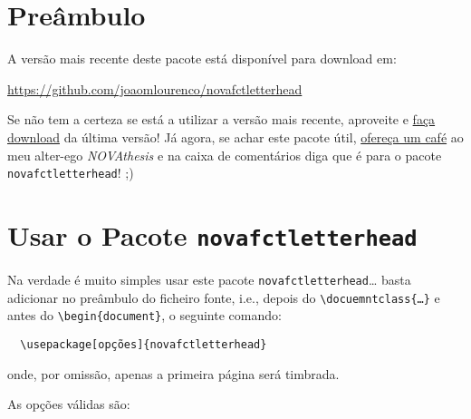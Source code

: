 \documentclass[a4paper,11pt]{article}
\title{\theTitle}
\author{\theAuthor}
\newcommand*{\thePackage}{\texttt{novafctletterhead}}
\begin{document}
\maketitle


\begin{abstract}
    Este documento é simultaneamente um manual de instruções e um exemplo de como usar o pacote “\thePackage”.  Este pacote permite produzir documentos em \emph{papel letterhead} da FCT-NOVA.
\end{abstract}


\section{Preâmbulo}

A versão mais recente deste pacote está disponível para download em:

\begin{center}
  \url{https://github.com/joaomlourenco/novafctletterhead}
\end{center}

Se não tem a certeza se está a utilizar a versão mais recente, aproveite e \href{https://github.com/joaomlourenco/novafctletterhead/archive/refs/heads/main.zip}{faça download} da última versão!   Já agora, se achar este pacote útil, \href{https://www.paypal.com/donate/?hosted_button_id=8WA8FRVMB78W8}{ofereça um café} ao meu alter-ego \emph{NOVAthesis} e na caixa de comentários diga que é para o pacote \thePackage! ;)


\section{Usar o Pacote \thePackage}

Na verdade é muito simples usar este pacote \thePackage…  basta adicionar no preâmbulo do ficheiro fonte, i.e., depois do \verb!\docuemntclass{…}! e antes do \verb!\begin{document}!, o seguinte comando:

\begin{verbatim}
  \usepackage[opções]{novafctletterhead}
\end{verbatim}

\noindent onde, por omissão, apenas a primeira página será timbrada.

\medskip
As opções válidas são:\vspace{-1.5ex}
\end{document}
